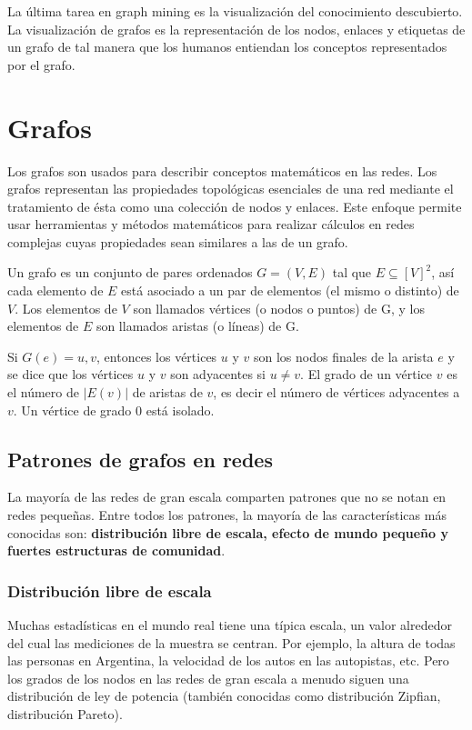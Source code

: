 La última tarea en graph mining es la visualización del conocimiento descubierto. La visualización de grafos es la representación de los nodos, enlaces y etiquetas de un grafo de tal manera que los humanos entiendan los conceptos representados por el grafo.\cite{Cook2006}

\section{Grafos}
Los grafos son usados para describir conceptos matemáticos en las redes. Los grafos representan las propiedades topológicas esenciales de una red mediante el tratamiento de ésta como una colección de nodos y enlaces. Este enfoque permite usar herramientas y métodos matemáticos para realizar cálculos en redes complejas cuyas propiedades sean similares a las de un grafo.

Un grafo es un conjunto de pares ordenados $G=(V,E)$ tal que $E\subseteq [V]^{2}$, así cada elemento de $E$ está asociado a un par de elementos (el mismo o distinto) de $V$. Los elementos de $V$ son llamados vértices (o nodos o puntos) de G, y los elementos de $E$ son llamados aristas (o líneas) de G.\cite{Diestel2005GraphTheory,Balakrishnan2000ATheory} 

Si $G(e)={u,v}$, entonces los vértices $u$ y $v$ son los nodos finales de la arista $e$ y se dice que los vértices $u$ y $v$ son adyacentes si $u \neq v$. El grado de un vértice $v$ es el número de $|E(v)|$ de aristas de $v$, es decir el número de vértices adyacentes a $v$. Un vértice de grado 0 está isolado.\cite{Diestel2005GraphTheory,Balakrishnan2000ATheory}

\subsection{Patrones de grafos en redes}\cite{Tang2010}
La mayoría de las redes de gran escala comparten patrones que no se notan en redes pequeñas. Entre todos los patrones, la mayoría de las características más conocidas son: \textbf{distribución libre de escala, efecto de mundo pequeño y fuertes estructuras de comunidad}.

\subsubsection{Distribución libre de escala}\cite{Tang2010}
Muchas estadísticas en el mundo real tiene una típica escala, un valor alrededor del cual las mediciones de la muestra se centran. Por ejemplo, la altura de todas las personas en Argentina, la velocidad de los autos en las autopistas, etc. Pero los grados de los nodos en las redes de gran escala a menudo siguen una distribución de ley de potencia (también conocidas como distribución Zipfian, distribución Pareto). 
 

